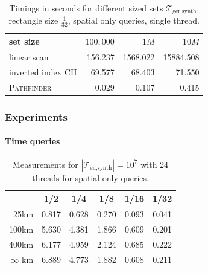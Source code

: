 \documentclass{beamer}
\newcommand{\pathfinder}{\textsc{Pathfinder}\xspace}
\newcommand{\traj}[2]{\mathcal{T}_{\text{#1},\text{#2}}}
\begin{document}
\begin{table}
	{
		\caption[Messungen$germany\_real\_1_naive_variants_threadripper$]{Timings in seconds for different sized sets $\traj{ger}{synth}$, rectangle size $\frac{1}{32}$, spatial only queries, single thread.
		}
		\begin{tabular}{|l||r|r|r|}
			\hline
			set size          & $100,000$ & $1 M$    & $10 M$
			\\ \hline
			linear scan       & 156.237   & 1568.022 & 15884.508 \\
			inverted index CH & 69.577    & 68.403   & 71.550    \\
			\pathfinder       & 0.029     & 0.107    & 0.415     \\
			\hline
		\end{tabular}
	}
\end{table}

\begin{frame}
	\frametitle{Experiments}
	\framesubtitle{Time queries}
	\begin{table}
		\caption[Messungen$europe\_10\_24_spatial_nekton$]{Measurements  for $|\traj{eu}{synth}| = 10^7$ with 24 threads for spatial only queries.}


		\footnotesize
		\centering
		\begin{tabular}{|r||c|c|c|c|c|}
			\hline
			\diagbox[width=40pt]{d}{} & 1/2   & 1/4   & 1/8   & 1/16  & 1/32
			\\\hline
			25km                      & 0.817 & 0.628 & 0.270 & 0.093 & 0.041 \\
			100km                     & 5.630 & 4.381 & 1.866 & 0.609 & 0.201 \\
			400km                     & 6.177 & 4.959 & 2.124 & 0.685 & 0.222 \\
			$\infty$ km               & 6.889 & 4.773 & 1.882 & 0.608 & 0.211 \\
			\hline
		\end{tabular}
	\end{table}
\end{frame}
\end{document}
